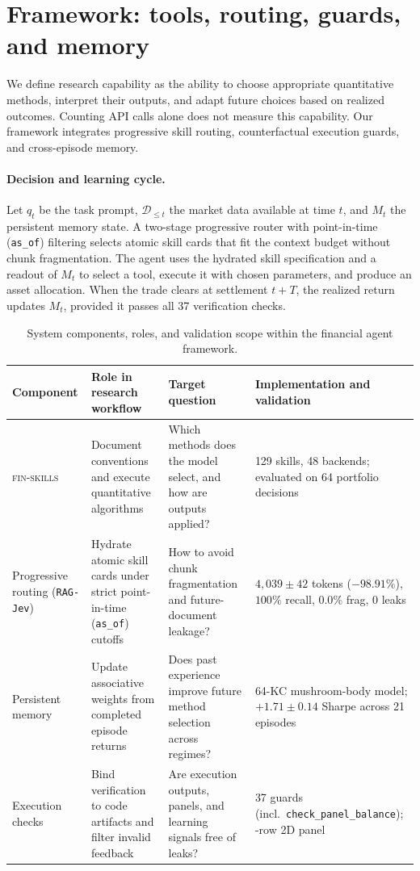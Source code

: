 \section{Framework: tools, routing, guards, and memory}
\label{sec:framework}
We define research capability as the ability to choose appropriate quantitative methods,
interpret their outputs, and adapt future choices based on realized outcomes.
Counting API calls alone does not measure this capability. Our framework integrates
progressive skill routing, counterfactual execution guards, and cross-episode memory.

\paragraph{Decision and learning cycle.}
Let $q_t$ be the task prompt, $\mathcal{D}_{\le t}$ the market data available at time $t$,
and $M_t$ the persistent memory state. A two-stage progressive router with point-in-time
(\texttt{as\_of}) filtering selects atomic skill cards that fit the context budget without
chunk fragmentation. The agent uses the hydrated skill specification and a readout of
$M_t$ to select a tool, execute it with chosen parameters, and produce an asset
allocation. When the trade clears at settlement $t+T$, the realized return updates
$M_t$, provided it passes all 37 verification checks.

\begin{table}[t]
\centering\small
\setlength{\tabcolsep}{5pt}
\begin{tabular}{p{}p{}p{}p{}}
\toprule
Component & Role in research workflow & Target question & Implementation and validation \\
\midrule
\textsc{fin-skills} & Document conventions and execute quantitative algorithms &
Which methods does the model select, and how are outputs applied? &
129 skills, 48 backends; evaluated on 64 portfolio decisions \\
Progressive routing (\texttt{RAG-Jev}) & Hydrate atomic skill cards under strict point-in-time (\texttt{as\_of}) cutoffs &
How to avoid chunk fragmentation and future-document leakage? &
$4{,}039 \pm 42$ tokens ($-98.91\%$), $100\%$ recall, $0.0\%$ frag, $0$ leaks \\
Persistent memory & Update associative weights from completed episode returns &
Does past experience improve future method selection across regimes? &
64-KC mushroom-body model; $+1.71 \pm 0.14$ Sharpe across 21 episodes \\
Execution checks & Bind verification to code artifacts and filter invalid feedback &
Are execution outputs, panels, and learning signals free of leaks? &
37 guards (incl.\ \texttt{check\_panel\_balance}); \PanelBalancedRows{}-row 2D panel \\
\bottomrule
\end{tabular}
\caption{System components, roles, and validation scope within the financial agent framework.}
\label{tab:framework}
\end{table}

